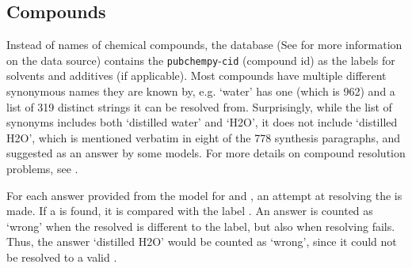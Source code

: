 \subsection{Compounds}\label{sub:compsolv}
Instead of names of chemical compounds, the database (See  for more information on the data source) contains the \texttt{pubchempy}-\texttt{cid} (compound id) as the labels for solvents and additives (if applicable).
Most compounds have multiple different synonymous names they are known by, e.g. `water' has one \cid (which is 962) and a list of 319 distinct strings it can be resolved from.
Surprisingly, while the list of synonyms includes both `distilled water' and `H2O', it does not include `distilled H2O', which is mentioned verbatim in eight of the 778 synthesis paragraphs, and suggested as an answer by some models.
For more details on compound resolution problems, see .

For each answer provided from the model for \tadd and \tsolv, an attempt at resolving the \cid is made.
If a \cid is found, it is compared with the label \cid.
An answer is counted as `wrong' when the resolved \cid is different to the label, but also when resolving fails.
Thus, the answer `distilled H2O' would be counted as `wrong', since it could not be resolved to a valid \cid.



